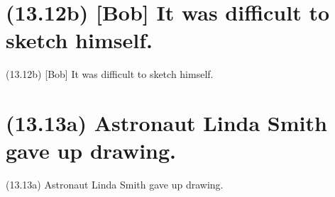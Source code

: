 \documentclass{article}
\begin{document}
\clearpage

%
%

\section*{(13.12b) [Bob] It was difficult to sketch himself.}

\bigbreak
\begin{enumerate*}
\item[(13.12b)] [Bob] It was difficult to sketch himself.
\end{enumerate*}
\bigbreak

\bigbreak
\begin{minipage}{\textwidth}
\end{minipage}
\bigbreak

\clearpage

%
%

\section*{(13.13a) Astronaut Linda Smith gave up drawing.}

\bigbreak
\begin{enumerate*}
\item[(13.13a)] Astronaut Linda Smith gave up drawing.
\end{enumerate*}
\bigbreak
\end{document}
